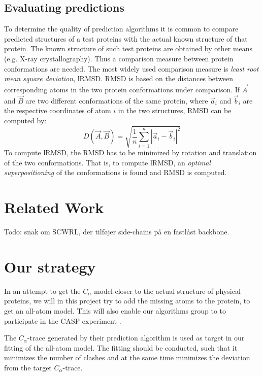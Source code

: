 \subsection{Evaluating predictions}
To determine the quality of prediction algorithms it is common 
to compare predicted structures of a test proteins with the actual
known structure of that protein. The known structure of such test
proteins are obtained by other means (e.g. X-ray crystallography).
Thus a comparison measure between protein conformations are
needed. The most widely used comparison measure is \textit{least root mean
  square deviation}, lRMSD. RMSD is based on the distances between
corresponding atoms in the two protein conformations under comparison.
If $\vec{A}$ and $\vec{B}$ are two different conformations of the same protein,
where $\vec{a}_i$ and $\vec{b}_i$ are the respective coordinates of atom $i$ in the two
structures, RMSD can be computed by:
\begin{equation}
  \label{eq:rmsd}
  D(\vec{A}, \vec{B}) = \sqrt{\frac{1}{n}\sum_{i=1}^n |\vec{a}_i - \vec{b}_i|^2}
\end{equation}
To compute lRMSD, the RMSD has to be minimized by rotation and
translation of the two conformations. That is, to compute lRMSD, an
\textit{optimal superpositioning} of the conformations is found and
RMSD is computed.




\section{Related Work}
Todo: snak om SCWRL, der tilføjer side-chains på en fastlåst backbone.

\section{Our strategy}
In an attempt to get the $C_\alpha$-model closer to the actual
structure of physical proteins, we will in this project try to add the
missing atoms to the protein, to get an all-atom model.  This will
also enable our algorithms group to to participate in the CASP
experiment \cite{caspwebsite}.

The $C_\alpha$-trace generated by their prediction algorithm is used
as target in our fitting of the all-atom model. The fitting should be
conducted, such that it minimizes the number of clashes and at the
same time minimizes the deviation from the target $C_\alpha$-trace.

